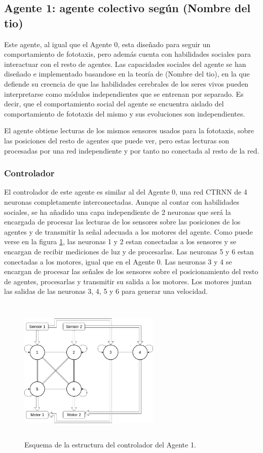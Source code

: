 \subsection{Agente 1: agente colectivo según (Nombre del tio)}
Este agente, al igual que el Agente 0, esta diseñado para seguir un comportamiento de fototaxis, pero además cuenta con habilidades sociales para interactuar con el resto de agentes. Las capacidades sociales del agente se han diseñado
e implementado basandose en la teoría de (Nombre del tio), en la que defiende su creencia de que las habilidades cerebrales de los seres vivos pueden interpretarse como módulos independientes que se entrenan por separado. Es decir, que
el comportamiento social del agente se encuentra aislado del comportamiento de fototaxis del mismo y sus evoluciones son independientes.

El agente obtiene lecturas de los mismos sensores usados para la fototaxis, sobre las posiciones del resto de agentes que puede ver, pero estas lecturas son procesadas por una red independiente y por tanto no conectada al resto de la red.

\subsubsection{Controlador}
El controlador de este agente es similar al del Agente 0, una red CTRNN de 4 neuronas completamente interconectadas. Aunque al contar con habilidades sociales, se ha añadido una capa independiente de 2 neuronas que será la encargada
de procesar las lecturas de los sensores sobre las posiciones de los agentes y de transmitir la señal adecuada a los motores del agente. Como puede verse en la figura \ref{fig:a1Controller}, las neuronas 1 y 2 estan conectadas a los
sensores y se encargan de recibir mediciones de luz y de procesarlas. Las neuronas 5 y 6 estan conectadas a los motores, igual que en el Agente 0. Las neuronas 3 y 4 se encargan de procesar las señales de los sensores sobre el posicionamiento
del resto de agentes, procesarlas y transmitir su salida a los motores. Los motores juntan las salidas de las neuronas 3, 4, 5 y 6 para generar una velocidad.

\begin{figure}[H]
	\centering
	\includegraphics[width=0.6\textwidth,height=7cm]{Imagenes/Agent1Controller}
	\caption{Esquema de la estructura del controlador del Agente 1.}
	\label{fig:a1Controller}
\end{figure}

